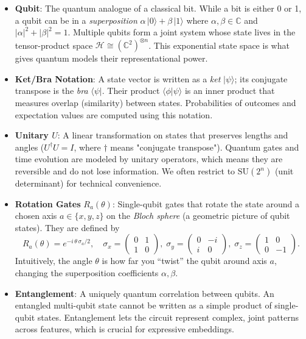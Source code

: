 \documentclass[11pt]{article}
\begin{document}
\begin{itemize}
  \item \textbf{Qubit}: The quantum analogue of a classical bit. While a bit is either 0 or 1, a qubit can be in a \emph{superposition} $\alpha\,|0\rangle + \beta\,|1\rangle$ where $\alpha,\beta\in\mathbb{C}$ and $|\alpha|^2+|\beta|^2=1$. Multiple qubits form a joint system whose state lives in the tensor-product space $\mathcal{H} \cong (\mathbb{C}^2)^{\otimes n}$. This exponential state space is what gives quantum models their representational power.
  \item \textbf{Ket/Bra Notation}: A state vector is written as a \emph{ket} $|\psi\rangle$; its conjugate transpose is the \emph{bra} $\langle\psi|$. Their product $\langle\phi|\psi\rangle$ is an inner product that measures overlap (similarity) between states. Probabilities of outcomes and expectation values are computed using this notation.
  \item \textbf{Unitary $U$}: A linear transformation on states that preserves lengths and angles ($U^\dagger U = I$, where $\dagger$ means "conjugate transpose"). Quantum gates and time evolution are modeled by unitary operators, which means they are reversible and do not lose information. We often restrict to $\mathrm{SU}(2^n)$ (unit determinant) for technical convenience.
  \item \textbf{Rotation Gates} $R_a(\theta)$: Single-qubit gates that rotate the state around a chosen axis $a\in\{x,y,z\}$ on the \emph{Bloch sphere} (a geometric picture of qubit states). They are defined by
  \begin{equation*}
    R_a(\theta) = e^{-i\,\theta\,\sigma_a/2},\quad \sigma_x = \begin{pmatrix}0&1\\1&0\end{pmatrix},\;\sigma_y=\begin{pmatrix}0&-i\\ i&0\end{pmatrix},\;\sigma_z=\begin{pmatrix}1&0\\0&-1\end{pmatrix}.
  \end{equation*}
  Intuitively, the angle $\theta$ is how far you “twist” the qubit around axis $a$, changing the superposition coefficients $\alpha,\beta$.
  \item \textbf{Entanglement}: A uniquely quantum correlation between qubits. An entangled multi-qubit state cannot be written as a simple product of single-qubit states. Entanglement lets the circuit represent complex, joint patterns across features, which is crucial for expressive embeddings.

\end{itemize}
\end{document}
